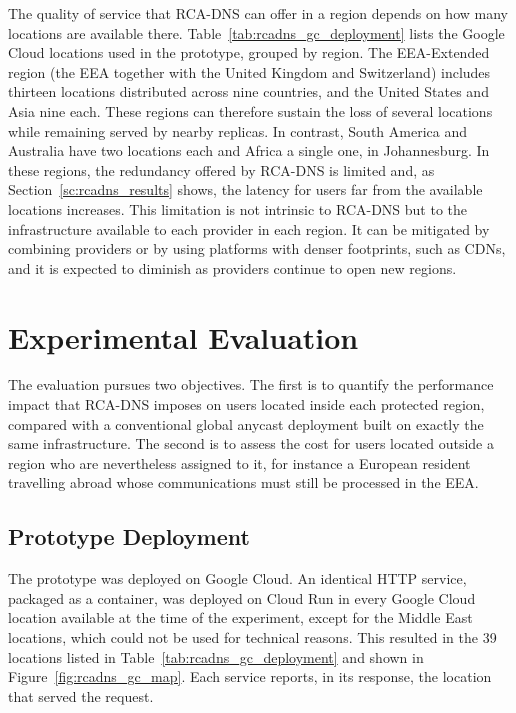 \documentclass[
A4paper,                %
twoside,                %
openright,              %
chapterprefix=true,     %
12pt,                   %
headings=normal,        %
titlepage=on            %
]{book}
\begin{document}
The quality of service that RCA-DNS can offer in a region depends on how many locations are available there. Table~\ref{tab:rcadns_gc_deployment} lists the Google Cloud locations used in the prototype, grouped by region. The EEA-Extended region (the EEA together with the United Kingdom and Switzerland) includes thirteen locations distributed across nine countries, and the United States and Asia nine each. These regions can therefore sustain the loss of several locations while remaining served by nearby replicas. In contrast, South America and Australia have two locations each and Africa a single one, in Johannesburg. In these regions, the redundancy offered by RCA-DNS is limited and, as Section~\ref{sc:rcadns_results} shows, the latency for users far from the available locations increases. This limitation is not intrinsic to RCA-DNS but to the infrastructure available to each provider in each region. It can be mitigated by combining providers or by using platforms with denser footprints, such as CDNs, and it is expected to diminish as providers continue to open new regions.

\section{Experimental Evaluation}
\label{sc:rcadns_evaluation}

The evaluation pursues two objectives. The first is to quantify the performance impact that RCA-DNS imposes on users located inside each protected region, compared with a conventional global anycast deployment built on exactly the same infrastructure. The second is to assess the cost for users located outside a region who are nevertheless assigned to it, for instance a European resident travelling abroad whose communications must still be processed in the EEA.

\subsection{Prototype Deployment}
\label{sc:rcadns_setup}

The prototype was deployed on Google Cloud. An identical HTTP service, packaged as a container, was deployed on Cloud Run in every Google Cloud location available at the time of the experiment, except for the Middle East locations, which could not be used for technical reasons. This resulted in the 39 locations listed in Table~\ref{tab:rcadns_gc_deployment} and shown in Figure~\ref{fig:rcadns_gc_map}. Each service reports, in its response, the location that served the request.
\end{document}
